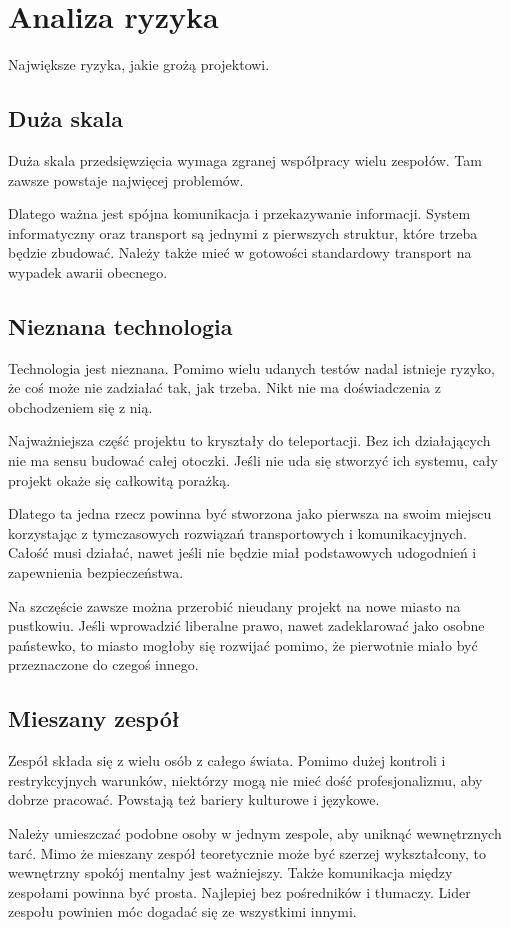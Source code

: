 \section{Analiza ryzyka}
Największe ryzyka, jakie grożą projektowi.
\subsection{Duża skala}
Duża skala przedsięwzięcia wymaga zgranej współpracy wielu zespołów. Tam zawsze powstaje najwięcej problemów. 

Dlatego ważna jest spójna komunikacja i przekazywanie informacji. System informatyczny oraz transport są jednymi z pierwszych struktur, które trzeba będzie zbudować.
Należy także mieć w gotowości standardowy transport na wypadek awarii obecnego.

\subsection{Nieznana technologia}
Technologia jest nieznana. Pomimo wielu udanych testów nadal istnieje ryzyko, że coś może nie zadziałać tak, jak trzeba. Nikt nie ma doświadczenia z obchodzeniem się z nią.

Najważniejsza część projektu to kryształy do teleportacji. Bez ich działających nie ma sensu budować całej otoczki.
Jeśli nie uda się stworzyć ich systemu, cały projekt okaże się całkowitą porażką.

Dlatego ta jedna rzecz powinna być stworzona jako pierwsza na swoim miejscu korzystając z tymczasowych rozwiązań transportowych i komunikacyjnych.
Całość musi działać, nawet jeśli nie będzie miał podstawowych udogodnień i zapewnienia bezpieczeństwa.

Na szczęście zawsze można przerobić nieudany projekt na nowe miasto na pustkowiu.
Jeśli wprowadzić liberalne prawo, nawet zadeklarować jako osobne państewko, to miasto mogłoby się rozwijać pomimo, że pierwotnie miało być przeznaczone do czegoś innego.

\subsection{Mieszany zespół}
Zespół składa się z wielu osób z całego świata. Pomimo dużej kontroli i restrykcyjnych warunków, niektórzy mogą nie mieć dość profesjonalizmu, aby dobrze pracować. Powstają też bariery kulturowe i językowe. 

Należy umieszczać podobne osoby w jednym zespole, aby uniknąć wewnętrznych tarć. Mimo że mieszany zespół teoretycznie może być szerzej wykształcony, to wewnętrzny spokój mentalny jest ważniejszy.
Także komunikacja między zespołami powinna być prosta. Najlepiej bez pośredników i tłumaczy. Lider zespołu powinien móc dogadać się ze wszystkimi innymi.


